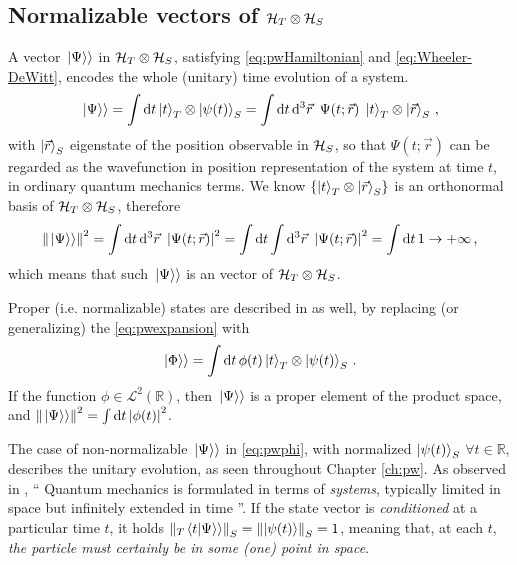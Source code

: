 \subsection{Normalizable vectors of $\mathcal{H}_T \otimes \mathcal{H}_S$}
\label{sec:properpw}

A vector $\left.\left| \Psi \right\rangle\right\rangle$ in $\mathcal{H}_T \otimes \mathcal{H}_S$,
satisfying \eqref{eq:pwHamiltonian} and \eqref{eq:Wheeler-DeWitt},
encodes the whole (unitary) time evolution of a system.
\begin{equation}\label{eq:pwexpansion}
  \left.\left| \Psi \right\rangle\right\rangle =
    \int \dd{t} \ket{t}_T \otimes \ket{\psi(t)}_S =
    \int \dd{t}\dd[3]{\vec{r}} \ \Psi(t; \vec{r}) \; \ket{t}_T \otimes \ket{\vec{r}}_S
    \,  \text{,}
\end{equation}
with $\ket{\vec{r}}_S$ eigenstate of the position observable in $\mathcal{H}_S$,
so that $\Psi(t; \vec{r})$ can be regarded as the wavefunction in position representation of the system at time $t$,
in ordinary quantum mechanics terms.
We know $\left\{\ket{t}_T \otimes \ket{\vec{r}}_S\right\}$ is an orthonormal basis of $\mathcal{H}_T \otimes \mathcal{H}_S$, therefore
\begin{equation}
  \norm{\left.\left| \Psi \right\rangle\right\rangle}^2 =
    \int \dd{t}\dd[3]{\vec{r}} \ \abs{\Psi(t; \vec{r})}^2 =
    \int \dd{t} \int \dd[3]{\vec{r}} \ \abs{\Psi(t; \vec{r})}^2 =
    \int \dd{t} 1 \rightarrow +\infty
    \,  \text{,}
\end{equation}
which means that such $\left.\left| \Psi \right\rangle\right\rangle$ is an  vector of $\mathcal{H}_T \otimes \mathcal{H}_S$.

Proper (i.e. normalizable) states are described in \citereset\cite{Lloyd:Time} as well, by replacing (or generalizing)
the \eqref{eq:pwexpansion} with
\begin{equation}\label{eq:pwphi}
  \left.\left| \Phi \right\rangle\right\rangle =
    \int \dd{t} \phi(t) \ket{t}_T \otimes \ket{\psi(t)}_S \, \text{.}
\end{equation}
If the function $\phi \in \mathscr{L}^2(\mathbb{R})$,
then $\left.\left| \Psi \right\rangle\right\rangle$ is a proper element of the product space,
and $\norm{\left.\left| \Psi \right\rangle\right\rangle}^2 = \int \dd{t} \abs{\phi(t)}^2$.

The case of non-normalizable $\left.\left| \Psi \right\rangle\right\rangle$ in \eqref{eq:pwphi},
with normalized $\ket{\psi(t)}_S$ $\forall t \in \mathbb{R}$,
describes the unitary evolution, as seen throughout Chapter \ref{ch:pw}.
As observed in \cite{Maccone:QGR},
``%
  Quantum mechanics is formulated in terms of \emph{systems},
  typically limited in space but infinitely extended in time%
''.
If the state vector is \emph{conditioned} at a particular time $t$,
it holds $\norm{_{T}\!\left.\left\langle t \middle| \Psi \right\rangle\right\rangle}_S = \norm{\ket{\psi(t)}}_S = 1$,
meaning that, at each $t$,
\emph{the particle must certainly be in some (one) point in space}.

